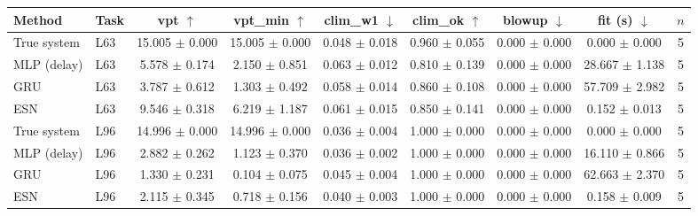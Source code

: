 \begin{tabular}{llccccccc}
\toprule
Method & Task & vpt $\uparrow$ & vpt\_min $\uparrow$ & clim\_w1 $\downarrow$ & clim\_ok $\uparrow$ & blowup $\downarrow$ & fit (s) $\downarrow$ & $n$ \\
\midrule
True system & L63 & 15.005 $\pm$ 0.000 & 15.005 $\pm$ 0.000 & 0.048 $\pm$ 0.018 & 0.960 $\pm$ 0.055 & 0.000 $\pm$ 0.000 & 0.000 $\pm$ 0.000 & 5 \\
MLP (delay) & L63 & 5.578 $\pm$ 0.174 & 2.150 $\pm$ 0.851 & 0.063 $\pm$ 0.012 & 0.810 $\pm$ 0.139 & 0.000 $\pm$ 0.000 & 28.667 $\pm$ 1.138 & 5 \\
GRU & L63 & 3.787 $\pm$ 0.612 & 1.303 $\pm$ 0.492 & 0.058 $\pm$ 0.014 & 0.860 $\pm$ 0.108 & 0.000 $\pm$ 0.000 & 57.709 $\pm$ 2.982 & 5 \\
ESN & L63 & 9.546 $\pm$ 0.318 & 6.219 $\pm$ 1.187 & 0.061 $\pm$ 0.015 & 0.850 $\pm$ 0.141 & 0.000 $\pm$ 0.000 & 0.152 $\pm$ 0.013 & 5 \\
\midrule
True system & L96 & 14.996 $\pm$ 0.000 & 14.996 $\pm$ 0.000 & 0.036 $\pm$ 0.004 & 1.000 $\pm$ 0.000 & 0.000 $\pm$ 0.000 & 0.000 $\pm$ 0.000 & 5 \\
MLP (delay) & L96 & 2.882 $\pm$ 0.262 & 1.123 $\pm$ 0.370 & 0.036 $\pm$ 0.002 & 1.000 $\pm$ 0.000 & 0.000 $\pm$ 0.000 & 16.110 $\pm$ 0.866 & 5 \\
GRU & L96 & 1.330 $\pm$ 0.231 & 0.104 $\pm$ 0.075 & 0.045 $\pm$ 0.004 & 1.000 $\pm$ 0.000 & 0.000 $\pm$ 0.000 & 62.663 $\pm$ 2.370 & 5 \\
ESN & L96 & 2.115 $\pm$ 0.345 & 0.718 $\pm$ 0.156 & 0.040 $\pm$ 0.003 & 1.000 $\pm$ 0.000 & 0.000 $\pm$ 0.000 & 0.158 $\pm$ 0.009 & 5 \\
\bottomrule
\end{tabular}

